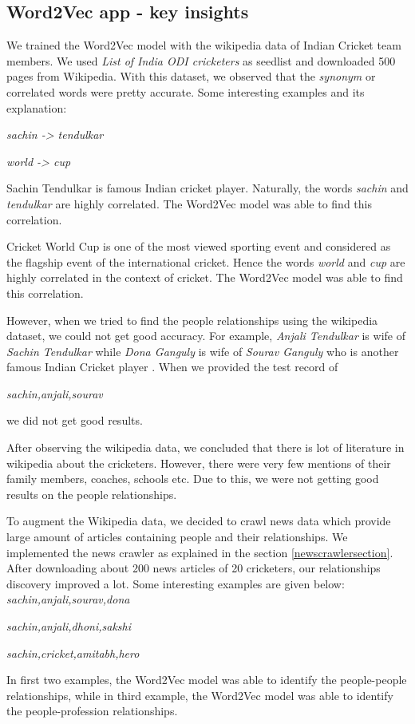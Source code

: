 \subsection{Word2Vec app - key insights}
We trained the Word2Vec model with the wikipedia data of Indian Cricket team
members. We used \textit{List of India ODI cricketers} as seedlist and
downloaded 500 pages from Wikipedia. With this dataset, we observed that the
\textit{synonym} or correlated words were pretty accurate. Some interesting
examples and its explanation:

\textit{sachin -> tendulkar}

\textit{world -> cup}

Sachin Tendulkar \cite{www-wiki-sachin-tendulkar} is famous Indian cricket
player. Naturally, the words \textit{sachin} and \textit{tendulkar} are
highly correlated. The Word2Vec model was able to find this correlation.

Cricket World Cup \cite{www-wiki-world-cup} is one of the most viewed
sporting event and considered as the flagship event of the international
cricket. Hence the words \textit{world} and \textit{cup} are highly correlated
 in the context of cricket. The Word2Vec model was able to find this correlation.

However, when we tried to find the people relationships using the wikipedia
dataset, we could not get good accuracy. For example, \textit{Anjali Tendulkar}
 is wife of \textit{Sachin Tendulkar} while \textit{Dona Ganguly} is wife of
 \textit{Sourav Ganguly} who is another famous Indian Cricket player
 \cite{www-wiki-sourav}. When we provided the test record of

 \textit{sachin,anjali,sourav}

 we did not get good results.

 After observing the wikipedia data, we concluded that there is lot of
 literature  in wikipedia about the cricketers. However, there were very few
 mentions of their family members, coaches, schools etc. Due to this, we were
  not getting good results on the people relationships.

  To augment the Wikipedia data, we decided to crawl news data which provide
 large amount of articles containing people and their relationships. We
 implemented the news crawler as explained in the section
 \ref{newscrawlersection}. After downloading about 200 news articles of 20
 cricketers, our relationships discovery improved a lot. Some interesting
 examples are given below:
 \textit{sachin,anjali,sourav,dona}

 \textit{sachin,anjali,dhoni,sakshi}

 \textit{sachin,cricket,amitabh,hero}

 In first two examples, the Word2Vec model was able to identify the
 people-people relationships, while in third example, the Word2Vec model was
 able to identify the people-profession relationships.







